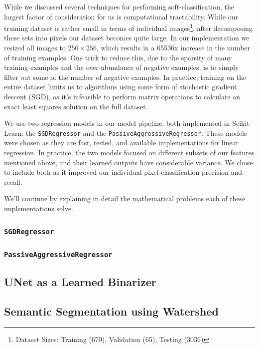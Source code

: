 \documentclass[paper=letter, fontsize=12pt]{article}
\numberwithin{equation}{section} %
\numberwithin{figure}{section} %
\numberwithin{table}{section} %
\begin{document}
While we discussed several techniques for performing soft-classification, the
largest factor of consideration for us is computational tractability.  While
our training dataset is rather small in terms of individual
images\footnote{Dataset Sizes: Training (670), Validation (65), Testing
(3036)}, after decomposing these sets into pixels our dataset becomes quite
large.  In our implementation we resized all images to $256 \times 256$, which 
results in a 65536x increase in the number of training examples.  One 
trick to reduce this, due to the sparsity of many training examples and the 
over-abundance of negative examples, is to simply filter out some of the number
of negative examples.  In practice, training on the entire dataset limits us to
algorithms using some form of stochastic gradient descent (SGD), as it's
infeasible to perform matrix operations to calculate an exact least squares
solution on the full dataset.

We use two regression models in our model pipeline, both implemented in
Scikit-Learn\cite{scikit-learn}: the \texttt{SGDRegressor} and the
\texttt{PassiveAggressiveRegressor}\cite{paregression}.  These models were
chosen as they are fast, tested, and available implementations for linear
regression.  In practice, the two models focused on different subsets of our
features mentioned above, and their learned outputs have considerable variance.
We chose to include both as it improved our individual pixel classification
precision and recall.

We'll continue by explaining in detail the mathematical problems each of these
implementations solve.

\subsubsection{\texttt{SGDRegressor}}

\subsubsection{\texttt{PassiveAggressiveRegressor}}

\subsection{UNet as a Learned Binarizer}

\subsection{Semantic Segmentation using Watershed}
\end{document}
